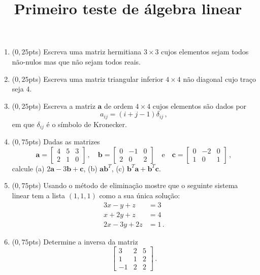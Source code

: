 \documentclass[12pt,a4paper]{article}
\title{Primeiro teste de álgebra linear}
\date{}
\newcommand{\mb}{\mathbf}
\begin{document}
\maketitle
\begin{enumerate}
  \item ($0{,}25$pts) Escreva uma matriz hermitiana $3\times 3$ cujos elementos sejam todos não-nulos mas que não sejam todos reais.
  \item ($0{,}25$pts) Escreva uma matriz triangular inferior $4\times 4$ não diagonal cujo traço seja $4$.
  \item ($0,25$pts) Escreva a matriz $\mb a$ de ordem $4\times 4$ cujos elementos são dados por
  $$a_{ij}=(i+j-1)\delta_{ij}\,,$$
  em que $\delta_{ij}$ é o símbolo de Kronecker.
  \item ($0{,}75$pts) Dadas as matrizes
  $$\mb a=\begin{bmatrix}
    4&5&3\\
    2&1&0
  \end{bmatrix}\,,\quad \mb b=\begin{bmatrix}
    0&-1&0\\
    2&0&2
  \end{bmatrix}\quad\text{e}\quad \mb c=\begin{bmatrix}
      0&-2&0\\
      1&0&1
  \end{bmatrix}\,,$$
  calcule (a) $2\mb a-3\mb b+\mb c$, (b) $\mb a\mb b^T$, (c) $\mb b^T\mb a+\mb b^T\mb c$.%
  \item ($0{,}75$pts) Usando o método de eliminação mostre que o seguinte sistema linear tem a lista $(1,1,1)$ como a sua única solução:
  \begin{equation*}
    \begin{split}
      3x-y+z&=3\\
      x+2y+z&=4\\
      2x-3y+2z&=1\,.
    \end{split}
  \end{equation*}
  \item ($0{,}75$pts) Determine a inversa da matriz
  $$\begin{bmatrix}
      3&2&5\\
      1&1&2\\
      -1&2&2
  \end{bmatrix}\,.$$
\end{enumerate}
\end{document}
